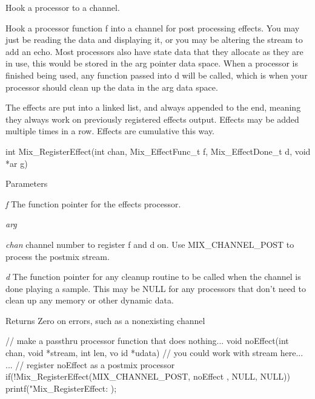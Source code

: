 Hook a processor to a channel. 

Hook a processor function f into a channel for post processing effects. You may just be reading the data and displaying it, or you may be altering the stream to add an echo. Most processors also have state data that they allocate as they are in use, this would be stored in the arg pointer data space. When a processor is finished being used, any function passed into d will be called, which is when your processor should clean up the data in the arg data space. 

The effects are put into a linked list, and always appended to the end, meaning they always work on previously registered effects output. Effects may be added multiple times in a row. Effects are cumulative this way. 


\begin{DoxyCode}
int Mix_RegisterEffect(int chan, Mix_EffectFunc_t f, Mix_EffectDone_t d, void *ar
      g)
\end{DoxyCode}
 
\begin{DoxyParams}{Parameters}
\item[{\em f}]The function pointer for the effects processor. \item[{\em arg}]\item[{\em chan}]channel number to register f and d on. Use MIX\_\-CHANNEL\_\-POST to process the postmix stream.\item[{\em d}]The function pointer for any cleanup routine to be called when the channel is done playing a sample. This may be NULL for any processors that don't need to clean up any memory or other dynamic data. \end{DoxyParams}
\begin{DoxyReturn}{Returns}
Zero on errors, such as a nonexisting channel 
\end{DoxyReturn}

\begin{DoxyCode}
                    // make a passthru processor function that does nothing...
                                void noEffect(int chan, void *stream, int len, vo
      id *udata)
                                {
                                        // you could work with stream here...
                                }
                                ...
                                // register noEffect as a postmix processor
                                if(!Mix_RegisterEffect(MIX_CHANNEL_POST, noEffect
      , NULL, NULL)) 
                        {
                                printf("Mix_RegisterEffect: %
      );
                        }
\end{DoxyCode}


